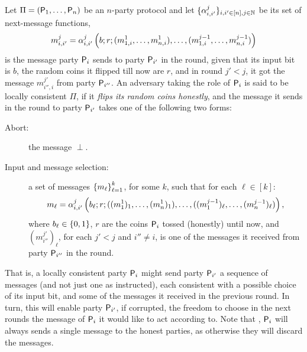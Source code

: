 \begin{definition}\label{def:Semi-ConssitentParties}
Let $\Pi=(\mathsf{P}_1,\ldots,\mathsf{P}_n)$ be an $n$-party protocol and let $\{\alpha_{i,i'}^j\}_{i,i' \in [n],j\in {\mathbb{N}}}$ be its set of next-message functions, \ie
\[
m^j_{i,i'}=\alpha_{i,i'}^j\left(b;r;(m^1_{1,i},\ldots,m^1_{n,i}),\ldots, (m^{j-1}_{1,i},\ldots,m^{j-1}_{n,i})\right)
\]
is the message party $\mathsf{P}_i$ sends to party $\mathsf{P}_{i'}$ in the \jth round, given that its input bit is $b$, the random coins it flipped till now are $r$, and in round $j' < j$, it got the message $m^{j'}_{i'',i}$ from party $\mathsf{P}_{i''}$. An adversary taking the role of $\mathsf{P}_i$ is said to be {\sf locally consistent} \wrt $\Pi$, if it \emph{flips its random coins honestly}, and the message it sends in the \jth round to party $\mathsf{P}_{i'}$ takes one of the following two forms:

\begin{description}
	\item[Abort:] the message $\perp$.
	
	\item[Input and message selection:] a set of messages $\left\{m_\ell\right\}_{\ell=1}^k$, for some $k$, such that for each $\ell \in [k]$:
\[
m_\ell = \alpha_{i,i'}^j\left(b_\ell;r;((m^1_{1})_1,\ldots,(m^1_{n})_1),\ldots, ((m^{j-1}_{1})_\ell,\ldots,(m^{j-1}_{n})_\ell)\right),
\]
where $b_\ell\in \{0,1\}$, $r$ are the coins $\mathsf{P}_i$ tossed (honestly) until now, and $(m^{j'}_{i''})_\ell$, for each $j'<j$ and $i''\neq i$, is one of the messages it received from party $\mathsf{P}_{i''}$ in the  round.
\end{description}
\end{definition}
That is, a locally consistent party $\mathsf{P}_{i}$ might send party $\mathsf{P}_{i'}$ a sequence of messages
(and not just one as instructed), each consistent with a possible choice of its input bit, and some of the messages it received in the previous round. In turn, this will enable party $\mathsf{P}_{i'}$, if corrupted, the freedom to choose in the next rounds the message of $\mathsf{P}_{i}$ it would like to act according to. Note that \wlg, $\mathsf{P}_{i}$ will always sends a single message to the honest parties, as otherwise they will discard the messages.

